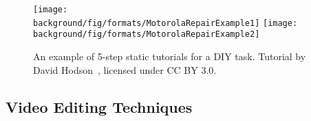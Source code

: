\begin{figure*}[ht!]
  \centering
  \texttt{[image: \\background/fig/formats/MotorolaRepairExample1]}
  \texttt{[image: \\background/fig/formats/MotorolaRepairExample2]}
  \caption{
    An example of 5-step static tutorials for a DIY task. Tutorial by David Hodson~\cite{MotorolaRepairExample}, licensed under CC BY 3.0.
  }
  \label{fig:background_diy}
\end{figure*}






\subsection{Video Editing Techniques}

